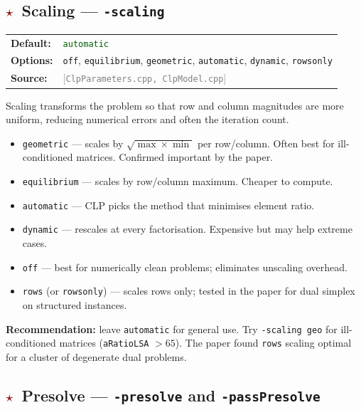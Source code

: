 \documentclass[11pt,a4paper]{article}
\newcommand{\param}[1]{\texttt{\textbf{#1}}}
\newcommand{\val}[1]{\texttt{#1}}
\newcommand{\src}[1]{\textcolor{gray}{\small[\texttt{#1}]}}
\newcommand{\default}[1]{\textcolor{darkgreen}{\texttt{#1}}}
\newcommand{\important}{\textcolor{darkred}{\textbf{$\star$}}}
\begin{document}
\subsection{\important\ Scaling --- \param{-scaling}}

\begin{tabular}{@{}ll@{}}
  \textbf{Default:} & \default{automatic} \\
  \textbf{Options:} & \val{off}, \val{equilibrium}, \val{geometric}, \val{automatic},
                      \val{dynamic}, \val{rowsonly} \\
  \textbf{Source:}  & \src{ClpParameters.cpp, ClpModel.cpp}
\end{tabular}

\medskip
Scaling transforms the problem so that row and column magnitudes are more uniform,
reducing numerical errors and often the iteration count.

\begin{itemize}[noitemsep]
  \item \val{geometric} --- scales by $\sqrt{\max \times \min}$ per row/column.
        Often best for ill-conditioned matrices. Confirmed important by the paper.
  \item \val{equilibrium} --- scales by row/column maximum. Cheaper to compute.
  \item \val{automatic} --- CLP picks the method that minimises element ratio.
  \item \val{dynamic} --- rescales at every factorisation. Expensive but may help
        extreme cases.
  \item \val{off} --- best for numerically clean problems; eliminates unscaling
        overhead.
  \item \val{rows} (or \val{rowsonly}) --- scales rows only; tested in the paper
        for dual simplex on structured instances.
\end{itemize}

\begin{tipbox}
  \textbf{Recommendation:} leave \val{automatic} for general use.
  Try \val{-scaling geo} for ill-conditioned matrices (\texttt{aRatioLSA} $> 65$).
  The paper found \val{rows} scaling optimal for a cluster of degenerate dual problems.
\end{tipbox}

\subsection{\important\ Presolve --- \param{-presolve} and \param{-passPresolve}}
\end{document}
